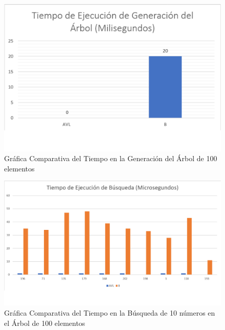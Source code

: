 \documentclass[acmsmall]{acmart}
\begin{document}
\begin{figure}[hbp]
  \centering
  \caption{Gráfica Comparativa del Tiempo en la Generación del Árbol de 100 elementos}

  \includegraphics[angle=0,scale=0.6]{100.1 elem.png}
  
\end{figure}

\begin{figure}[hbp]
  \centering
  \caption{Gráfica Comparativa del Tiempo en la Búsqueda de 10 números en el Árbol de 100 elementos}

  \includegraphics[angle=0,scale=0.5]{100.2 elem.png}
  
\end{figure}
\clearpage
\end{document}
